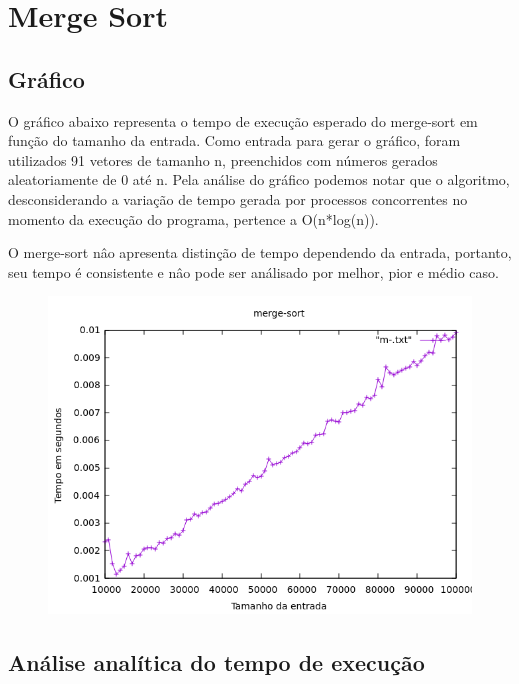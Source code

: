 \chapter{Merge Sort}

\section{Gráfico}
O gráfico abaixo representa o tempo de execução esperado do merge-sort em função do tamanho da entrada. Como entrada para gerar o gráfico, foram utilizados 91 vetores de tamanho n, preenchidos com números gerados aleatoriamente de 0 até n. Pela análise do gráfico podemos notar que o algoritmo, desconsiderando a variação de tempo gerada por processos concorrentes no momento da execução do programa, pertence a O(n*log(n)).

O merge-sort nâo apresenta distinção de tempo dependendo da entrada, portanto, seu tempo é consistente e nâo pode ser análisado por melhor, pior e médio caso.
\begin{figure}[h]
    \centering
    \includegraphics[width=1\linewidth]{Imagens/m-.png}
\end{figure}

\newpage

\section{Análise analítica do tempo de execução}

